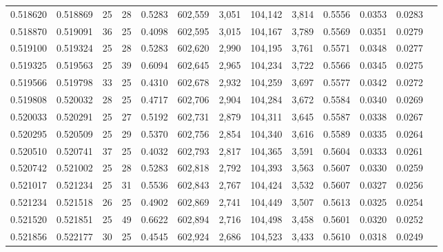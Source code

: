 \begin{tabular}{rrrrrrrrrrrrr}
0.518620 & 0.518869 &    25 &  28 &                                     0.5283 & 602,559 &   3,051 & 104,142 &   3,814 & 0.5556 & 0.0353 & 0.0283 \\
0.518870 & 0.519091 &    36 &  25 &                                     0.4098 & 602,595 &   3,015 & 104,167 &   3,789 & 0.5569 & 0.0351 & 0.0279 \\
0.519100 & 0.519324 &    25 &  28 &                                     0.5283 & 602,620 &   2,990 & 104,195 &   3,761 & 0.5571 & 0.0348 & 0.0277 \\
0.519325 & 0.519563 &    25 &  39 &                                     0.6094 & 602,645 &   2,965 & 104,234 &   3,722 & 0.5566 & 0.0345 & 0.0275 \\
0.519566 & 0.519798 &    33 &  25 &                                     0.4310 & 602,678 &   2,932 & 104,259 &   3,697 & 0.5577 & 0.0342 & 0.0272 \\
0.519808 & 0.520032 &    28 &  25 &                                     0.4717 & 602,706 &   2,904 & 104,284 &   3,672 & 0.5584 & 0.0340 & 0.0269 \\
0.520033 & 0.520291 &    25 &  27 &                                     0.5192 & 602,731 &   2,879 & 104,311 &   3,645 & 0.5587 & 0.0338 & 0.0267 \\
0.520295 & 0.520509 &    25 &  29 &                                     0.5370 & 602,756 &   2,854 & 104,340 &   3,616 & 0.5589 & 0.0335 & 0.0264 \\
0.520510 & 0.520741 &    37 &  25 &                                     0.4032 & 602,793 &   2,817 & 104,365 &   3,591 & 0.5604 & 0.0333 & 0.0261 \\
0.520742 & 0.521002 &    25 &  28 &                                     0.5283 & 602,818 &   2,792 & 104,393 &   3,563 & 0.5607 & 0.0330 & 0.0259 \\
0.521017 & 0.521234 &    25 &  31 &                                     0.5536 & 602,843 &   2,767 & 104,424 &   3,532 & 0.5607 & 0.0327 & 0.0256 \\
0.521234 & 0.521518 &    26 &  25 &                                     0.4902 & 602,869 &   2,741 & 104,449 &   3,507 & 0.5613 & 0.0325 & 0.0254 \\
0.521520 & 0.521851 &    25 &  49 &                                     0.6622 & 602,894 &   2,716 & 104,498 &   3,458 & 0.5601 & 0.0320 & 0.0252 \\
0.521856 & 0.522177 &    30 &  25 &                                     0.4545 & 602,924 &   2,686 & 104,523 &   3,433 & 0.5610 & 0.0318 & 0.0249 \\

\end{tabular}
